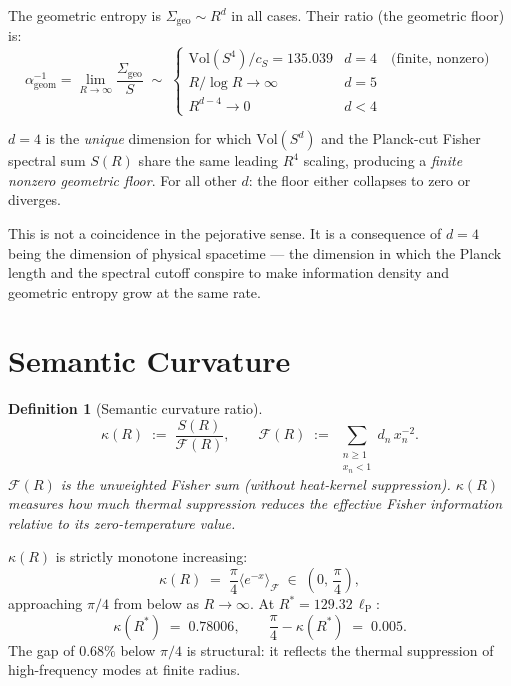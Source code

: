 \documentclass[12pt,a4paper]{article}
\newcommand{\lP}{\ell_{\mathrm{P}}}
\newcommand{\ai}{\alpha^{-1}}
\newcommand{\Sg}{\Sigma_{\mathrm{geo}}}
\newcommand{\kap}{\kappa}
\newcommand{\floor}{\ai_{\mathrm{geom}}}
\newtheorem{definition}{Definition}[section]
\begin{document}
The geometric entropy is $\Sg \sim R^d$ in all cases.
Their ratio (the geometric floor) is:
\begin{equation}
  \floor = \lim_{R\to\infty}\frac{\Sg}{S}
  \;\sim\;
  \begin{cases}
    \mathrm{Vol}(S^4)/c_S = 135.039 & d=4\quad\text{(finite, nonzero)} \\
    R/\log R \to \infty & d=5 \\
    R^{d-4} \to 0 & d<4
  \end{cases}
\end{equation}

\begin{Tbox}
$d = 4$ is the \emph{unique} dimension for which
$\mathrm{Vol}(S^d)$ and the Planck-cut Fisher spectral
sum $S(R)$ share the same leading $R^4$ scaling,
producing a \emph{finite nonzero geometric floor}.
For all other $d$: the floor either collapses to zero
or diverges.

This is not a coincidence in the pejorative sense.
It is a consequence of $d=4$ being the dimension of
physical spacetime --- the dimension in which
the Planck length and the spectral cutoff conspire
to make information density and geometric entropy
grow at the same rate.
\end{Tbox}

\section{Semantic Curvature}
\label{sec:kappa}

\begin{definition}[Semantic curvature ratio]
\begin{equation}
  \kap(R)
  \;:=\;
  \frac{S(R)}{\mathcal{F}(R)},
  \qquad
  \mathcal{F}(R)
  \;:=\;
  \sum_{\substack{n \geq 1 \\ x_n < 1}}
  d_n\,x_n^{-2}.
\end{equation}
$\mathcal{F}(R)$ is the unweighted Fisher sum
(without heat-kernel suppression).
$\kap(R)$ measures how much thermal suppression
reduces the effective Fisher information
relative to its zero-temperature value.
\end{definition}

\begin{Tbox}[Behaviour of $\kap$]
$\kap(R)$ is strictly monotone increasing:
\begin{equation}
  \kap(R)
  \;=\; \frac{\pi}{4}\langle e^{-x}\rangle_{\mathcal{F}}
  \;\in\; \left(0,\,\frac{\pi}{4}\right),
\end{equation}
approaching $\pi/4$ from below as $R \to \infty$.
At $R^* = 129.32\,\lP$:
\begin{equation}
  \kap(R^*) \;=\; 0.78006,
  \qquad
  \frac{\pi}{4} - \kap(R^*) \;=\; 0.005.
\end{equation}
The gap of $0.68\%$ below $\pi/4$ is structural:
it reflects the thermal suppression of high-frequency
modes at finite radius.
\end{Tbox}
\end{document}
